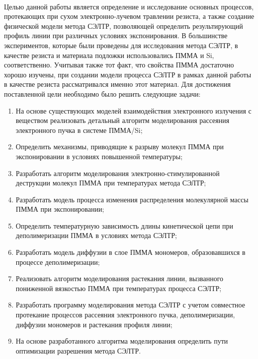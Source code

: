 \aimsandtasks\ 

Целью данной работы является определение и исследование основных процессов, протекающих при сухом электронно-лучевом травлении резиста, а также создание физической модели метода СЭЛТР, позволяющей определить результирующий профиль линии при различных условиях экспонирования. В большинстве экспериментов, которые были проведены для исследования метода СЭЛТР, в качестве резиста и материала подложки использовались ПММА и Si, соответственно. Учитывая также тот факт, что свойства ПММА достаточно хорошо изучены, при создании модели процесса СЭЛТР в рамках данной работы в качестве резиста рассматривался именно этот материал. Для достижения поставленной цели необходимо было решить следующие задачи:

\begin{enumerate}
  \item На основе существующих моделей взаимодействия электронного излучения с веществом реализовать детальный алгоритм моделирования рассеяния электронного пучка в системе ПММА/Si;
  \item Определить механизмы, приводящие к разрыву молекул ПММА при экспонировании в условиях повышенной температуры;
  \item Разработать алгоритм моделирования электронно-стимулированной деструкции молекул ПММА при температурах метода СЭЛТР;
  \item Разработать модель процесса изменения распределения молекулярной массы ПММА при экспонировании;
  \item Определить температурную зависимость длины кинетической цепи при деполимеризации ПММА в условиях метода СЭЛТР;
  \item Разработать модель диффузии в слое ПММА мономеров, образовавшихся в процессе деполимеризации;
  \item Реализовать алгоритм моделирования растекания линии, вызванного пониженной вязкостью ПММА при температурах процесса СЭЛТР;
  \item Разработать программу моделирования метода СЭЛТР с учетом совместное протекание процессов рассеяния электронного пучка, деполимеризации, диффузии мономеров и растекания профиля линии;
  \item На основе разработанного алгоритма моделирования определить пути оптимизации разрешения метода СЭЛТР.
\end{enumerate}



